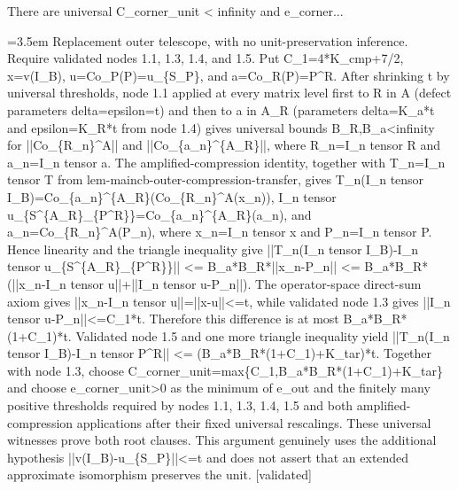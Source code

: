 \documentclass{article}
\newcommand{\step}[1]{\par\noindent\hangindent=3.5em\hangafter=1%
  \makebox[3.5em][l]{\textbf{#1.}}}
\newcommand{\steptag}[1]{\hfill{\small\textsf{[#1]}}}
\begin{document}
\begin{proofbox}{There are universal C\_corner\_unit < infinity and e\_corner...}
\step{1.6.2} Replacement outer telescope, with no unit-preservation inference. Require validated nodes 1.1, 1.3, 1.4, and 1.5. Put C\_1=4*K\_cmp+7/2, x=v(I\_B), u=Co\_P(P)=u\_\{S\_P\}, and a=Co\_R(P)=P\textasciicircum{}R. After shrinking t by universal thresholds, node 1.1 applied at every matrix level first to R in A (defect parameters delta=epsilon=t) and then to a in A\_R (parameters delta=K\_a*t and epsilon=K\_R*t from node 1.4) gives universal bounds B\_R,B\_a<infinity for ||Co\_\{R\_n\}\textasciicircum{}A|| and ||Co\_\{a\_n\}\textasciicircum{}\{A\_R\}||, where R\_n=I\_n tensor R and a\_n=I\_n tensor a. The amplified-compression identity, together with T\_n=I\_n tensor T from lem-maincb-outer-compression-transfer, gives T\_n(I\_n tensor I\_B)=Co\_\{a\_n\}\textasciicircum{}\{A\_R\}(Co\_\{R\_n\}\textasciicircum{}A(x\_n)), I\_n tensor u\_\{S\textasciicircum{}\{A\_R\}\_\{P\textasciicircum{}R\}\}=Co\_\{a\_n\}\textasciicircum{}\{A\_R\}(a\_n), and a\_n=Co\_\{R\_n\}\textasciicircum{}A(P\_n), where x\_n=I\_n tensor x and P\_n=I\_n tensor P. Hence linearity and the triangle inequality give ||T\_n(I\_n tensor I\_B)-I\_n tensor u\_\{S\textasciicircum{}\{A\_R\}\_\{P\textasciicircum{}R\}\}|| <= B\_a*B\_R*||x\_n-P\_n|| <= B\_a*B\_R*(||x\_n-I\_n tensor u||+||I\_n tensor u-P\_n||). The operator-space direct-sum axiom gives ||x\_n-I\_n tensor u||=||x-u||<=t, while validated node 1.3 gives ||I\_n tensor u-P\_n||<=C\_1*t. Therefore this difference is at most B\_a*B\_R*(1+C\_1)*t. Validated node 1.5 and one more triangle inequality yield ||T\_n(I\_n tensor I\_B)-I\_n tensor P\textasciicircum{}R|| <= (B\_a*B\_R*(1+C\_1)+K\_tar)*t. Together with node 1.3, choose C\_corner\_unit=max\{C\_1,B\_a*B\_R*(1+C\_1)+K\_tar\} and choose e\_corner\_unit>0 as the minimum of e\_out and the finitely many positive thresholds required by nodes 1.1, 1.3, 1.4, 1.5 and both amplified-compression applications after their fixed universal rescalings. These universal witnesses prove both root clauses. This argument genuinely uses the additional hypothesis ||v(I\_B)-u\_\{S\_P\}||<=t and does not assert that an extended approximate isomorphism preserves the unit. \steptag{validated} \\[4pt]
\end{proofbox}
\end{document}
